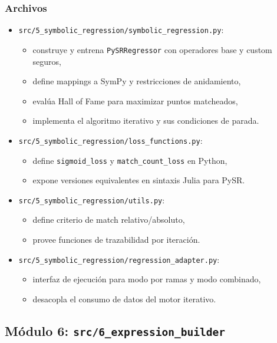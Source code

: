 \documentclass[12pt]{article}
\begin{document}
\subsubsection*{Archivos}
\begin{itemize}[leftmargin=1.5em]
    \item \texttt{src/5\_symbolic\_regression/symbolic\_regression.py}:
    \begin{itemize}[leftmargin=1.5em]
        \item construye y entrena \texttt{PySRRegressor} con operadores base y custom seguros,
        \item define mappings a SymPy y restricciones de anidamiento,
        \item evalúa Hall of Fame para maximizar puntos matcheados,
        \item implementa el algoritmo iterativo y sus condiciones de parada.
    \end{itemize}
    \item \texttt{src/5\_symbolic\_regression/loss\_functions.py}:
    \begin{itemize}[leftmargin=1.5em]
        \item define \texttt{sigmoid\_loss} y \texttt{match\_count\_loss} en Python,
        \item expone versiones equivalentes en sintaxis Julia para PySR.
    \end{itemize}
    \item \texttt{src/5\_symbolic\_regression/utils.py}:
    \begin{itemize}[leftmargin=1.5em]
        \item define criterio de match relativo/absoluto,
        \item provee funciones de trazabilidad por iteración.
    \end{itemize}
    \item \texttt{src/5\_symbolic\_regression/regression\_adapter.py}:
    \begin{itemize}[leftmargin=1.5em]
        \item interfaz de ejecución para modo por ramas y modo combinado,
        \item desacopla el consumo de datos del motor iterativo.
    \end{itemize}
\end{itemize}

\subsection{Módulo 6: \texttt{src/6\_expression\_builder}}
\end{document}

